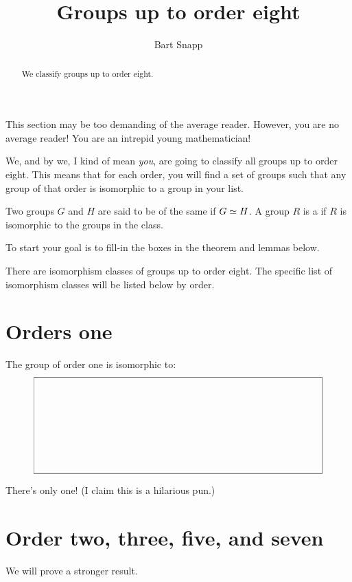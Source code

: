 \documentclass{ximera}
\author{Bart Snapp}
\title{Groups up to order eight}
\begin{document}
\begin{abstract}
  We classify groups up to order eight.
\end{abstract}
\maketitle

This section may be too demanding of the average reader. However, you
are no average reader! You are an intrepid young mathematician!

We, and by we, I kind of mean \textit{you}, are going to classify all
groups up to order eight. This means that for each order, you will
find a set of groups such that any group of that order is isomorphic
to a group in your list.

\begin{definition}
  Two groups $G$ and $H$ are said to be of the same  if $G\simeq H$. A group $R$ is a  if $R$ is isomorphic to the groups in the
  class.
\end{definition}


To start your goal is to fill-in the boxes in the theorem and lemmas
below.

\begin{theorem}
  There are  isomorphism classes of groups up to
  order eight. The specific list of isomorphism classes will be listed
  below by order.
\end{theorem}


\section{Orders one}

\begin{lemma}
  The group of order one is isomorphic to:
  \[
  \framebox(300,100){}
  \]
  \begin{sketch}
    There's only one! (I claim this is a hilarious pun.)
  \end{sketch}
\end{lemma}

\section{Order two, three, five, and seven}

We will prove a stronger result.
\end{document}

